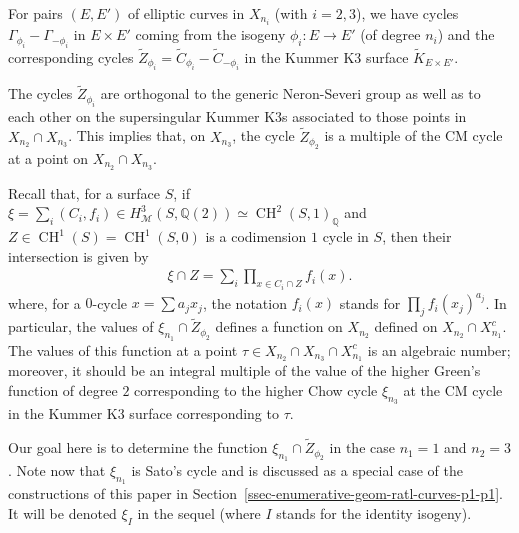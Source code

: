 \documentclass[11pt,a4paper]{article}
\DeclareMathOperator{\CH}{CH}
\begin{document}
For pairs $(E, E')$ of elliptic curves in $X_{n_i}$ (with $i = 2, 3$), we have cycles $\Gamma_{\phi_i} - \Gamma_{-\phi_i}$ in $E \times E'$ coming from the isogeny $\phi_i: E \to E'$ (of degree $n_i$) and the corresponding cycles $\widetilde{Z}_{\phi_i} = \widetilde{C}_{\phi_i}-\widetilde{C}_{-\phi_i}$ in the Kummer K3 surface $\widetilde{K}_{E \times E'}$.

The cycles $\widetilde{Z}_{\phi_i}$ are orthogonal to the generic Neron-Severi group as well as to each other on the supersingular Kummer K3s associated to those points in $X_{n_2} \cap X_{n_3}$. This implies that, on $X_{n_3}$, the cycle $\widetilde{Z}_{\phi_2}$ is a multiple of the CM cycle at a point on $X_{n_2} \cap X_{n_3}$.

Recall that, for a surface $S$, if $\xi = \sum_i (C_i, f_i) \in H^3_{\mathcal{M}}(S, \mathbb{Q}(2)) \simeq \CH^2(S, 1)_{\mathbb{Q}}$ and $Z \in \CH^1(S) = \CH^1(S, 0)$ is a codimension $1$ cycle in $S$, then their intersection is given by
\begin{align}
  \xi \cap Z = \sum_{i} \prod_{x \in C_i \cap Z} f_i(x).
\end{align}
where, for a $0$-cycle $x = \sum a_j x_j$, the notation $f_i(x)$ stands for $\prod_j f_i(x_j)^{a_j}$. In particular, the values of $\xi_{n_1} \cap \widetilde{Z}_{\phi_2}$ defines a function on $X_{n_2}$ defined on $X_{n_2} \cap X_{n_1}^c$. The values of this function at a point $\tau \in X_{n_2} \cap X_{n_3} \cap X_{n_1}^c$ is an algebraic number; moreover, it should be an integral multiple of the value of the higher Green's function of degree $2$ corresponding to the higher Chow cycle $\xi_{n_3}$ at the CM cycle in the Kummer K3 surface corresponding to $\tau$.

Our goal here is to determine the function $\xi_{n_1} \cap \widetilde{Z}_{\phi_2}$ in the case $n_1 = 1$ and $n_2 = 3$. Note now that $\xi_{n_1}$ is Sato's cycle and is discussed as a special case of the constructions of this paper in Section~\ref{ssec-enumerative-geom-ratl-curves-p1-p1}. It will be denoted $\xi_{I}$ in the sequel (where $I$ stands for the identity isogeny).
\end{document}
